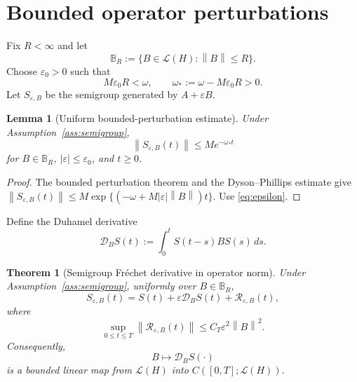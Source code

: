 \documentclass[11pt]{article}
\newtheorem{theorem}[assumption]{Theorem}
\newtheorem{lemma}[assumption]{Lemma}
\theoremstyle{remark}
\newcommand{\cL}{\mathcal L}
\newcommand{\norm}[1]{\left\lVert #1\right\rVert}
\newcommand{\abs}[1]{\left\lvert #1\right\rvert}
\begin{document}
\section{Bounded operator perturbations}

Fix $R<\infty$ and let
\begin{equation}\label{eq:Bball}
 \mathbb B_R:=\{B\in\cL(H):\norm{B}\le R\}.
\end{equation}
Choose $\varepsilon_0>0$ such that
\begin{equation}\label{eq:epsilon}
 M\varepsilon_0R<\omega,
 \qquad
 \omega_*:=\omega-M\varepsilon_0R>0.
\end{equation}
Let $S_{\varepsilon,B}$ be the semigroup generated by $A+\varepsilon B$.

\begin{lemma}[Uniform bounded-perturbation estimate]\label{lem:pert-bound}
Under Assumption~\ref{ass:semigroup},
\begin{equation}\label{eq:pert-stability}
 \norm{S_{\varepsilon,B}(t)}
 \le
 Me^{-\omega_*t}
\end{equation}
for $B\in\mathbb B_R$, $\abs{\varepsilon}\le\varepsilon_0$, and $t\ge0$.
\end{lemma}

\begin{proof}
The bounded perturbation theorem and the Dyson--Phillips estimate give
$\norm{S_{\varepsilon,B}(t)}\le M\exp\{(-\omega+M\abs{\varepsilon}\norm{B})t\}$. Use \eqref{eq:epsilon}.
\end{proof}

Define the Duhamel derivative
\begin{equation}\label{eq:DS}
 \mathcal D_BS(t)
 :=
 \int_0^tS(t-s)BS(s)\,ds.
\end{equation}

\begin{theorem}[Semigroup Fr\'echet derivative in operator norm]\label{thm:semigroup-derivative}
Under Assumption~\ref{ass:semigroup}, uniformly over $B\in\mathbb B_R$,
\begin{equation}\label{eq:semigroup-expansion}
 S_{\varepsilon,B}(t)
 =
 S(t)+\varepsilon\mathcal D_BS(t)
 +\mathcal R_{\varepsilon,B}(t),
\end{equation}
where
\begin{equation}\label{eq:semigroup-remainder}
 \sup_{0\le t\le T}
 \norm{\mathcal R_{\varepsilon,B}(t)}
 \le
 C_T\varepsilon^2\norm{B}^2.
\end{equation}
Consequently,
\begin{equation}\label{eq:frechet-S}
 B\longmapsto\mathcal D_BS(\cdot)
\end{equation}
is a bounded linear map from $\cL(H)$ into $C([0,T];\cL(H))$.
\end{theorem}
\end{document}
